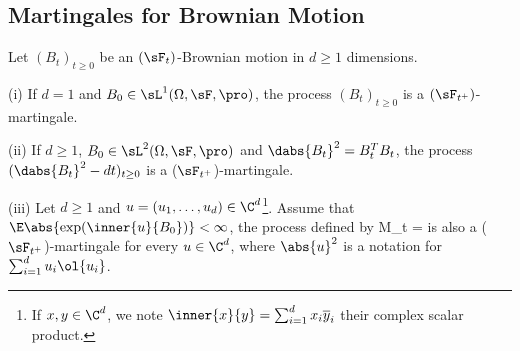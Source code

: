 %
%
%
%



\subsection{Martingales for Brownian Motion}

\begin{theorem}\label{thm:brownian_motion_martingale}
Let $(B_t)_{t \geq 0}$ be an $(\sF_t)$-Brownian motion in $d \geq 1$ dimensions.
\ben
\item [(i)] If $d = 1$ and $B_0 \in \sL^1(\Omega,\sF,\pro)$, the process $(B_t)_{t \geq 0}$ is a $(\sF_{t^+})$-martingale.
\item [(ii)] If $d \geq 1$, $B_0 \in \sL^2(\Omega,\sF,\pro)$ and $\dabs{B_t}^2 = B_t^TB_t$, the process $(\dabs{B_t}^2 - dt)_{ t \geq 0}$ is a ($\sF_{t^+}$)-martingale.
\item [(iii)] Let $d \geq 1$ and $u = (u_1,\dots, u_d) \in \C^d$\footnote{If $x, y \in \C^d$, we note $\inner{x}{y} = \sum^d_{i=1} x_i\overline{y}_i$ their complex scalar product.}. Assume that $\E\abs{\exp(\inner{u}{B_0})} < \infty$, the process defined by
\be
M_t = \exp{}
\ee
is also a ($\sF_{t^+}$)-martingale for every $u \in \C^d$, where $\abs{u}^2$ is a notation for $\sum^d_{i=1} u_i\ol{u_i}$.
\een
\end{theorem}


